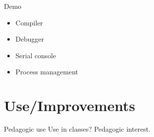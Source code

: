 \documentclass{beamer}
\begin{document}
    \begin{frame}{Demo}
      \begin{itemize}
        \item Compiler
        \item Debugger
        \item Serial console
        \item Process management
      \end{itemize}
    \end{frame}

  \section{Use/Improvements}
    \begin{frame}{Pedagogic use}
        Use in classes? Pedagogic interest.
    \end{frame}
\end{document}

